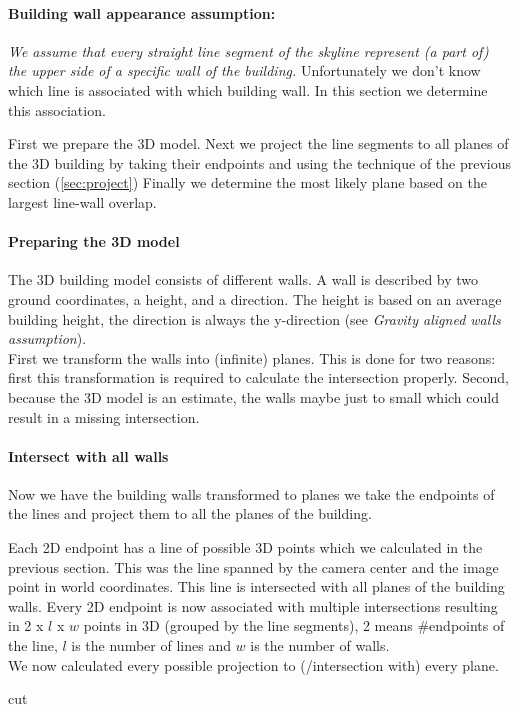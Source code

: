 	\paragraph{Building wall appearance assumption:}
	\emph{We assume that every straight line segment of the skyline represent (a part of) the upper side of a specific wall of the building.}
	Unfortunately we don't know which line is associated with which building
	wall. In this section we determine this association.

	First we prepare the 3D model. Next we project the line segments to all planes of the 3D building by
	taking their endpoints and using the technique of the previous section (\ref{sec:project})
	Finally we determine the most likely plane based on the largest line-wall overlap. 

	\paragraph{Preparing the 3D model}
	The 3D building model consists of different walls. A wall is described by
	two ground coordinates, a height, and a direction.
	The height is based on an average building height, the direction is always the
	y-direction (see \emph{Gravity aligned walls assumption}).\\
	First we transform the walls into (infinite) planes.  This is done for two
	reasons: first this transformation is required to calculate the intersection
	properly. Second, because the 3D model is an estimate, the walls maybe just
	to small which could result in a missing intersection. \\


	\paragraph{Intersect with all walls}
	Now we have the building walls transformed to planes we take the endpoints of the
	lines and project them to all the planes of the building.  

	Each 2D endpoint has a line of possible 3D points which we calculated in the
	previous section. This was the line spanned by the camera center and the
	image point in world coordinates.
	This line is intersected with all planes of the building walls. Every 2D
	endpoint is now associated with multiple intersections resulting in 2 x
	$l$ x $w$ points in 3D (grouped by the line segments), 2 means
	\#endpoints of the line, $l$ is the number of lines and $w$ is the number of
	walls.\\

	We now calculated every possible projection to (/intersection with) every plane. 
	
	cut
